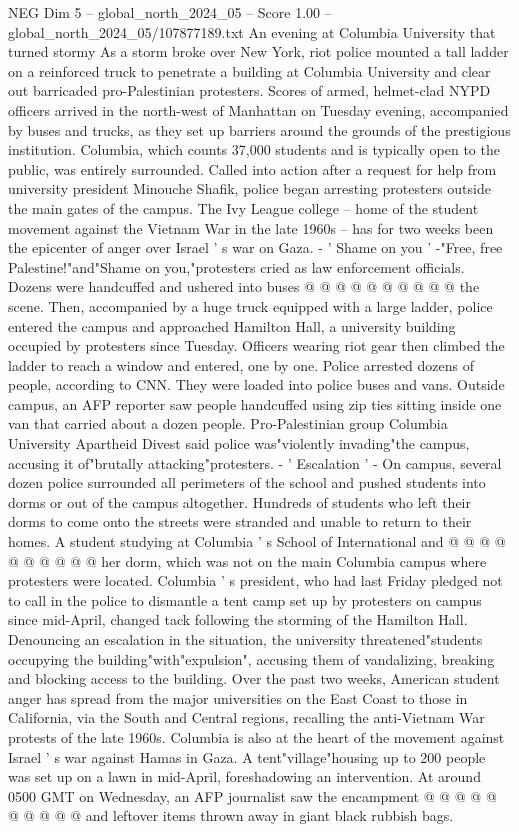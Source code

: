 \begin{textsample}{NEG Dim 5 – global\_north\_2024\_05 – Score 1.00 – global\_north\_2024\_05/107877189.txt}  \label{ex:f5_neg_287}
An evening at Columbia University that turned stormy As a storm broke over New York, riot police mounted a tall ladder on a reinforced truck to penetrate a building at Columbia University and clear out barricaded pro-Palestinian protesters.
Scores of armed, helmet-clad NYPD officers arrived in the north-west of Manhattan on Tuesday evening, accompanied by buses and trucks, as they set up barriers around the grounds of the prestigious institution.
Columbia, which counts 37,000 students and is typically open to the public, was entirely surrounded.
Called into action after a request for help from university president Minouche Shafik, police began arresting protesters outside the main gates of the campus.
The Ivy League college -- home of the student movement against the Vietnam War in the late 1960s -- has for two weeks been the epicenter of anger over Israel ' s war on Gaza. - ' Shame on you ' -"Free, free Palestine!"and"Shame on you,"protesters cried as law enforcement officials.
Dozens were handcuffed and ushered into buses @ @ @ @ @ @ @ @ @ @ the scene.
Then, accompanied by a huge truck equipped with a large ladder, police entered the campus and approached Hamilton Hall, a university building occupied by protesters since Tuesday.
Officers wearing riot gear then climbed the ladder to reach a window and entered, one by one.
Police arrested dozens of people, according to CNN.
They were loaded into police buses and vans.
Outside campus, an AFP reporter saw people handcuffed using zip ties sitting inside one van that carried about a dozen people.
Pro-Palestinian group Columbia University Apartheid Divest said police was"violently invading"the campus, accusing it of"brutally attacking"protesters. - ' Escalation ' - On campus, several dozen police surrounded all perimeters of the school and pushed students into dorms or out of the campus altogether.
Hundreds of students who left their dorms to come onto the streets were stranded and unable to return to their homes.
A student studying at Columbia ' s School of International and @ @ @ @ @ @ @ @ @ @ her dorm, which was not on the main Columbia campus where protesters were located.
Columbia ' s president, who had last Friday pledged not to call in the police to dismantle a tent camp set up by protesters on campus since mid-April, changed tack following the storming of the Hamilton Hall.
Denouncing an escalation in the situation, the university threatened"students occupying the building"with"expulsion", accusing them of vandalizing, breaking and blocking access to the building.
Over the past two weeks, American student anger has spread from the major universities on the East Coast to those in California, via the South and Central regions, recalling the anti-Vietnam War protests of the late 1960s.
Columbia is also at the heart of the movement against Israel ' s war against Hamas in Gaza.
A tent"village"housing up to 200 people was set up on a lawn in mid-April, foreshadowing an intervention.
At around 0500 GMT on Wednesday, an AFP journalist saw the encampment @ @ @ @ @ @ @ @ @ @ and leftover items thrown away in giant black rubbish bags.

\end{textsample}
